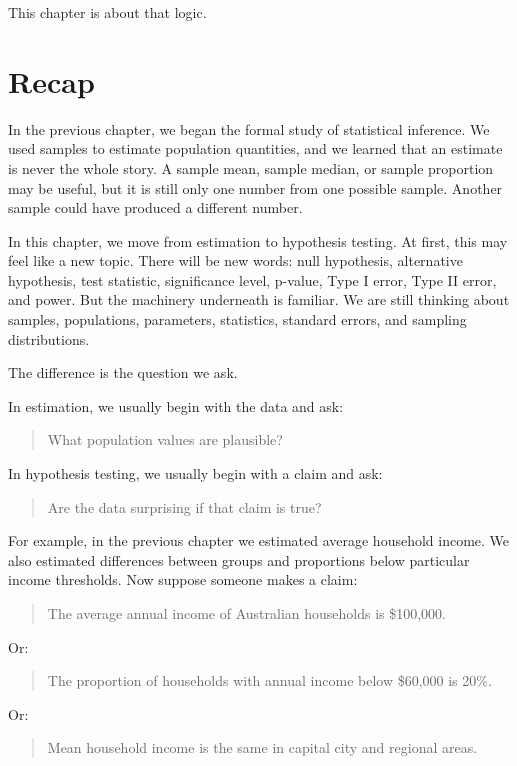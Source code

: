 \documentclass[
  letterpaper,
  DIV=11,
  numbers=noendperiod]{scrreprt}
\begin{document}
This chapter is about that logic.

\section{Recap}\label{recap}

In the previous chapter, we began the formal study of statistical
inference. We used samples to estimate population quantities, and we
learned that an estimate is never the whole story. A sample mean, sample
median, or sample proportion may be useful, but it is still only one
number from one possible sample. Another sample could have produced a
different number.

In this chapter, we move from estimation to hypothesis testing. At
first, this may feel like a new topic. There will be new words: null
hypothesis, alternative hypothesis, test statistic, significance level,
p-value, Type I error, Type II error, and power. But the machinery
underneath is familiar. We are still thinking about samples,
populations, parameters, statistics, standard errors, and sampling
distributions.

The difference is the question we ask.

In estimation, we usually begin with the data and ask:

\begin{quote}
What population values are plausible?
\end{quote}

In hypothesis testing, we usually begin with a claim and ask:

\begin{quote}
Are the data surprising if that claim is true?
\end{quote}

For example, in the previous chapter we estimated average household
income. We also estimated differences between groups and proportions
below particular income thresholds. Now suppose someone makes a claim:

\begin{quote}
The average annual income of Australian households is \$100,000.
\end{quote}

Or:

\begin{quote}
The proportion of households with annual income below \$60,000 is 20\%.
\end{quote}

Or:

\begin{quote}
Mean household income is the same in capital city and regional areas.
\end{quote}
\end{document}
